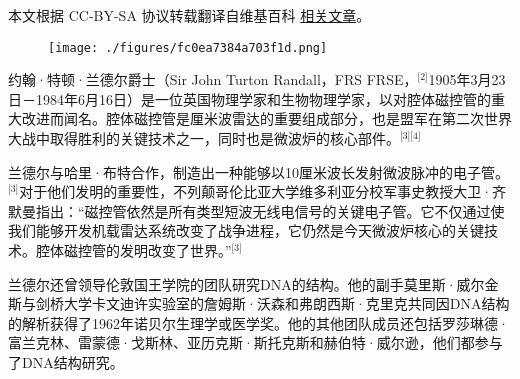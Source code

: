 
本文根据 CC-BY-SA 协议转载翻译自维基百科 \href{https://en.wikipedia.org/wiki/John_Randall_(physicist)}{相关文章}。

\begin{figure}[ht]
\centering
\texttt{[image: ./figures/fc0ea7384a703f1d.png]}
\caption{} \label{fig_YHldr_1}
\end{figure}
约翰·特顿·兰德尔爵士（Sir John Turton Randall，FRS FRSE，\(^\text{[2]}\)1905年3月23日－1984年6月16日）是一位英国物理学家和生物物理学家，以对腔体磁控管的重大改进而闻名。腔体磁控管是厘米波雷达的重要组成部分，也是盟军在第二次世界大战中取得胜利的关键技术之一，同时也是微波炉的核心部件。\(^\text{[3][4]}\)

兰德尔与哈里·布特合作，制造出一种能够以10厘米波长发射微波脉冲的电子管。\(^\text{[3]}\)对于他们发明的重要性，不列颠哥伦比亚大学维多利亚分校军事史教授大卫·齐默曼指出：“磁控管依然是所有类型短波无线电信号的关键电子管。它不仅通过使我们能够开发机载雷达系统改变了战争进程，它仍然是今天微波炉核心的关键技术。腔体磁控管的发明改变了世界。”\(^\text{[3]}\)

兰德尔还曾领导伦敦国王学院的团队研究DNA的结构。他的副手莫里斯·威尔金斯与剑桥大学卡文迪许实验室的詹姆斯·沃森和弗朗西斯·克里克共同因DNA结构的解析获得了1962年诺贝尔生理学或医学奖。他的其他团队成员还包括罗莎琳德·富兰克林、雷蒙德·戈斯林、亚历克斯·斯托克斯和赫伯特·威尔逊，他们都参与了DNA结构研究。
